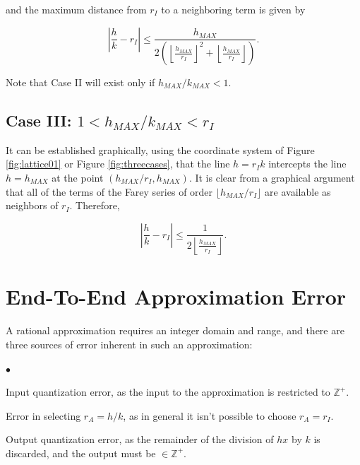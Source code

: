 \documentclass{esub2acm}
\newcommand{\intsetnonneg}{{\mathbb{Z}^+}}
\newenvironment{generalenum}{\begin{list}
               {$\bullet$}{\setlength{\labelwidth}{3mm}\setlength{\leftmargin}{6mm}}}
               {\end{list}}
\begin{document}
and the maximum distance from $r_I$ to a neighboring term is
given by

\begin{equation}
\label{eq:caseiimaxplacementerror}
\left|
\frac{h}{k} - r_I
\right|
\leq
\frac{h_{MAX}}{2 \left( { {\left\lfloor {\frac{h_{MAX}}{r_I}} \right\rfloor}^2
+ \left\lfloor {\frac{h_{MAX}}{r_I}} \right\rfloor } \right) }.
\end{equation}

Note that Case II will exist only if $h_{MAX}/k_{MAX} < 1$.


\subsection{Case III:  $1 < h_{MAX}/k_{MAX} < r_I$}
\label{subsec:caseiii}

It can be established graphically, using the coordinate system of
Figure \ref{fig:lattice01}
or Figure \ref{fig:threecases}, that the line $h=r_I k$ intercepts the
line $h=h_{MAX}$ at the point $(h_{MAX}/r_I, h_{MAX})$.  It is clear
from a graphical argument that all of the terms of the Farey series
of order $\lfloor h_{MAX}/r_I \rfloor$ are available as neighbors
of $r_I$.  Therefore,

\begin{equation}
\label{caseiiiplacementerror}
\left|
\frac{h}{k} - r_I
\right|
\leq
\frac{1}{2 \left\lfloor \frac{h_{MAX}}{r_I} \right\rfloor}.
\end{equation}


\section{End-To-End Approximation Error}
\label{sec:endtoenderror}

A rational approximation requires an integer domain and range, and there are three
sources of error inherent in such an approximation:

\begin{generalenum}

\item Input quantization error, as the input to the approximation is restricted
      to $\intsetnonneg$.

\item Error in selecting $r_A = h / k$, as in general it isn't possible to choose
      $r_A = r_I$.

\item Output quantization error, as the remainder of the division of $hx$ by
      $k$ is discarded, and the output must be $\in \intsetnonneg$.

\end{generalenum}
\end{document}
